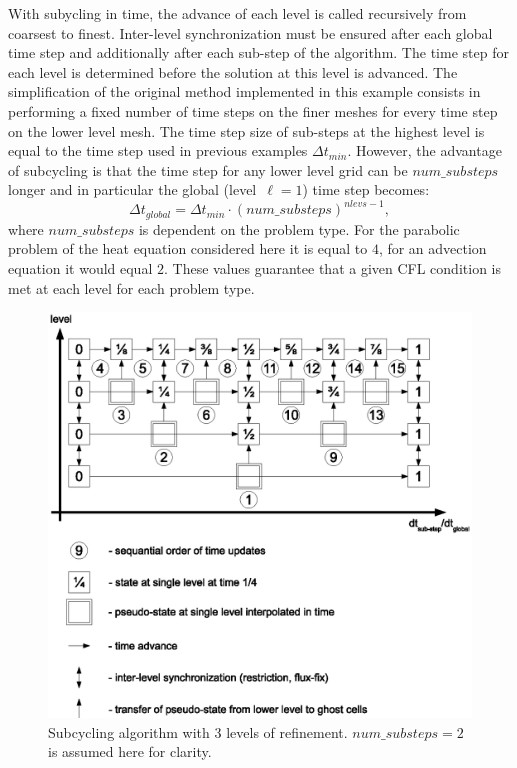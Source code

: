 With subycling in time, the advance of each level is called
recursively from coarsest to finest.  Inter-level synchronization must
be ensured after each global time step and additionally after each
sub-step of the algorithm. The time step for each level is determined
before the solution at this level is advanced. The simplification of
the original method implemented in this example consists in performing
a fixed number of time steps on the finer meshes for every time step
on the lower level mesh.  The time step size of sub-steps at the
highest level is equal to the time step used in previous examples
$\Delta t_{min}$. However, the advantage of subcycling is that the
time step for any lower level grid can be $num\_substeps$ longer and
in particular the global (level~$\ell=1$) time step becomes:
\begin{equation}
	\Delta t_{global} = \Delta t_{min}  \cdot {(num\_substeps)}^{nlevs-1},
\end{equation}
where $num\_substeps$ is dependent on the problem type. For the
parabolic problem of the heat equation considered here it is equal to
$4$, for an advection equation it would equal $2$. These values
guarantee that a given CFL condition is met at each level for each
problem type.

\begin{figure}[tb]
\centering
\includegraphics{./F_AdvancedTopics/subcycling_algorithm}
\caption{\label{fig:subcycling_algorithm} Subcycling algorithm with 3 levels of refinement. 
        $num\_substeps=2$ is assumed here for clarity. }
\end{figure}

